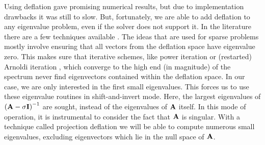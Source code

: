 Using deflation gave promising numerical results, but due to implementation drawbacks it was still to slow. But, fortunately, we are able to add deflation to any eigenvalue problem, even if the solver does not support it. In the literature there are a few techniques available \cite[section 4.2]{saad_numerical_2011}\cite{mackey_deflation_2008}. The ideas that are used for sparse problems mostly involve ensuring that all vectors from the deflation space have eigenvalue zero. This makes sure that iterative schemes, like power iteration or (restarted) Arnoldi iteration \cite{arnoldi_principle_1951}, which converge to the high end (in magnitude) of the spectrum never find eigenvectors contained within the deflation space. In our case, we are only interested in the first small eigenvalues. This forces us to use these eigenvalue routines in shift-and-invert mode. Here, the largest eigenvalues of $\left(\vb{A} - \sigma \vb{I}\right)^{-1}$ are sought, instead of the eigenvalues of $\vb{A}$ itself. In this mode of operation, it is instrumental to consider the fact that $\vb{A}$ is singular. With a technique called projection deflation we will be able to compute numerous small eigenvalues, excluding eigenvectors which lie in the null space of $\vb{A}$.

